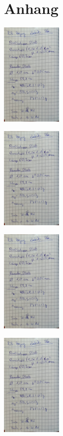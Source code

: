 \section*{Anhang}

\begin{minipage}[t]{0.4\textwidth}
    \includegraphics[height=5cm, page=1]{Inhalte/v103_messdaten.pdf}
\end{minipage}
\begin{minipage}[t]{0.4\textwidth}
    \includegraphics[height=5cm, keepaspectratio, page=2]{Inhalte/v103_messdaten.pdf}
\end{minipage}

\begin{minipage}[t]{0.4\textwidth}
    \includegraphics[height=5cm, page=3]{Inhalte/v103_messdaten.pdf}
\end{minipage}
\begin{minipage}[t]{0.4\textwidth}
    \includegraphics[height=5cm, keepaspectratio, page=4]{Inhalte/v103_messdaten.pdf}
\end{minipage}

